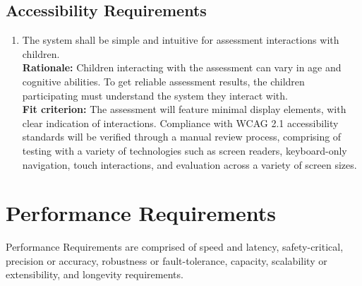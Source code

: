 \documentclass[12pt]{article}
\begin{document}
\subsection{Accessibility Requirements}
\begin{enumerate}[label={UH-AR\arabic*}. ]
  \item The system shall be simple and intuitive for assessment interactions with children.\\
  \textbf{Rationale: }Children interacting with the assessment can vary in age and cognitive abilities. To get reliable assessment results, the children participating must understand the system they interact with.\\
  \textbf{Fit criterion: }The assessment will feature minimal display elements, with clear indication of interactions. Compliance with WCAG 2.1 accessibility standards will be verified through a manual review process, comprising of testing
  with a variety of technologies such as screen readers, keyboard-only navigation, touch interactions, and evaluation across a variety of screen sizes.
\end{enumerate}

\newpage

\section{Performance Requirements}
\hspace{2em}Performance Requirements are comprised of speed and latency, safety-critical, precision or accuracy, robustness or fault-tolerance, capacity, scalability or extensibility, and longevity requirements.
\end{document}
